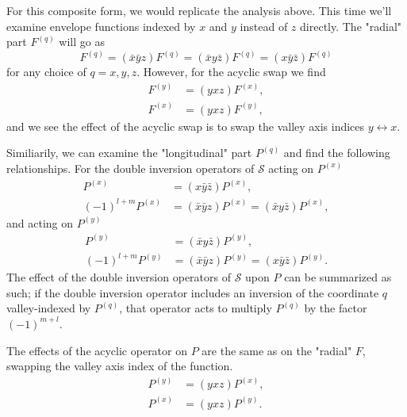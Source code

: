 For this composite form, we would replicate the analysis above. This time we'll
examine envelope functions indexed by $x$ and $y$ instead of $z$ directly. The
"radial" part $F^{ \left(q\right) }$ will go as 
\begin{equation}
  F^{\left(q\right)}
  =
    \left(\bar{x}\bar{y}z\right)F^{\left(q\right)}
  =
    \left(\bar{x}y\bar{z}\right)F^{\left(q\right)}
  =
    \left(x\bar{y}\bar{z}\right)F^{\left(q\right)}
\end{equation}
for any choice of $q = x,y,z$. However, for the acyclic swap we find
\begin{align}
  F^{\left(y\right)}
  & =
    \left(yxz\right)F^{\left(x\right)},
  \\
  F^{\left(x\right)}
  & =
    \left(yxz\right)F^{\left(y\right)},
\end{align}
and we see the effect of the acyclic swap is to swap the valley axis indices $y
\leftrightarrow x$.


Similiarily, we can examine the "longitudinal" part $P^{\left(q\right)}$ and
find the following relationships. For the double inversion operators of
$\mathcal{S}$ acting on $P^{\left(x\right)}$
\begin{align}
  P^{\left(x\right)}
  & =
    \left(x\bar{y}\bar{z}\right)P^{\left(x\right)},
  \\
  \left(-1\right)^{l+m}P^{\left(x\right)}
  & =
    \left(\bar{x}\bar{y}z\right)P^{\left(x\right)}
  =
    \left(\bar{x}y\bar{z}\right)P^{\left(x\right)},
\end{align}
and acting on $P^{\left(y\right)}$
\begin{align}
  P^{\left(y\right)}
  & =
    \left(\bar{x}y\bar{z}\right)P^{\left(y\right)},
  \\
  \left(-1\right)^{l+m}P^{\left(y\right)}
  & =
    \left(\bar{x}\bar{y}z\right)P^{\left(y\right)}
  =
    \left(x\bar{y}\bar{z}\right)P^{\left(y\right)}.
\end{align}
The effect of the double inversion operators of $\mathcal{S}$ upon $P$ can be
summarized as such; if the double inversion operator includes an inversion of
the coordinate $q$ valley-indexed by $P^{\left(q\right)}$, that operator
acts to multiply $P^{\left(q\right)}$ by the factor $\left(-1\right)^{m+l}$.

The effects of the acyclic operator on $P$ are the same as on the "radial" $F$,
swapping the valley axis index of the function.
\begin{align}
  P^{\left(y\right)}
  & =
    \left(yxz\right)P^{\left(x\right)},
  \\
  P^{\left(x\right)}
  & =
    \left(yxz\right)P^{\left(y\right)}.
\end{align}

